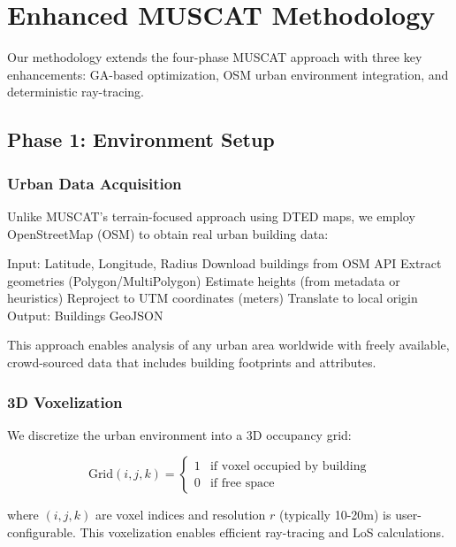 
\section{Enhanced MUSCAT Methodology}

Our methodology extends the four-phase MUSCAT approach with three key enhancements: GA-based optimization, OSM urban environment integration, and deterministic ray-tracing.

\subsection{Phase 1: Environment Setup}

\subsubsection{Urban Data Acquisition}

Unlike MUSCAT's terrain-focused approach using DTED maps, we employ OpenStreetMap (OSM) to obtain real urban building data:

\begin{algorithmic}
\STATE Input: Latitude, Longitude, Radius
\STATE Download buildings from OSM API
\STATE Extract geometries (Polygon/MultiPolygon)
\STATE Estimate heights (from metadata or heuristics)
\STATE Reproject to UTM coordinates (meters)
\STATE Translate to local origin
\STATE Output: Buildings GeoJSON
\end{algorithmic}

This approach enables analysis of any urban area worldwide with freely available, crowd-sourced data that includes building footprints and attributes.

\subsubsection{3D Voxelization}

We discretize the urban environment into a 3D occupancy grid:

\begin{equation}
\text{Grid}(i,j,k) = \begin{cases}
1 & \text{if voxel occupied by building} \\
0 & \text{if free space}
\end{cases}
\end{equation}

where $(i,j,k)$ are voxel indices and resolution $r$ (typically 10-20m) is user-configurable. This voxelization enables efficient ray-tracing and LoS calculations.

